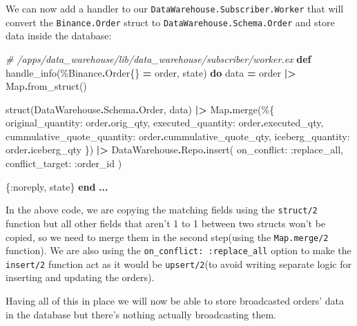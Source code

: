 \documentclass[
  oneside]{book}
\newenvironment{Shaded}{\begin{snugshade}}{\end{snugshade}}
\newcommand{\CommentTok}[1]{\textcolor[rgb]{0.56,0.35,0.01}{\textit{#1}}}
\newcommand{\ConstantTok}[1]{\textcolor[rgb]{0.00,0.00,0.00}{#1}}
\newcommand{\KeywordTok}[1]{\textcolor[rgb]{0.13,0.29,0.53}{\textbf{#1}}}
\newcommand{\NormalTok}[1]{#1}
\newcommand{\OperatorTok}[1]{\textcolor[rgb]{0.81,0.36,0.00}{\textbf{#1}}}
\newcommand{\VariableTok}[1]{\textcolor[rgb]{0.00,0.00,0.00}{#1}}
\begin{document}
We can now add a handler to our \texttt{DataWarehouse.Subscriber.Worker} that will convert the \texttt{Binance.Order} struct to \texttt{DataWarehouse.Schema.Order} and store data inside the database:

\begin{Shaded}
\begin{Highlighting}[]
\CommentTok{\# /apps/data\_warehouse/lib/data\_warehouse/subscriber/worker.ex}
  \KeywordTok{def}\NormalTok{ handle\_info(\%}\ConstantTok{Binance}\OperatorTok{.}\ConstantTok{Order}\NormalTok{\{\} }\OperatorTok{=}\NormalTok{ order, state) }\KeywordTok{do}
\NormalTok{    data }\OperatorTok{=}
\NormalTok{      order}
      \OperatorTok{|\textgreater{}} \ConstantTok{Map}\OperatorTok{.}\NormalTok{from\_struct()}

\NormalTok{    struct(}\ConstantTok{DataWarehouse}\OperatorTok{.}\ConstantTok{Schema}\OperatorTok{.}\ConstantTok{Order}\NormalTok{, data)}
    \OperatorTok{|\textgreater{}} \ConstantTok{Map}\OperatorTok{.}\NormalTok{merge(\%\{}
      \VariableTok{original\_quantity:}\NormalTok{ order}\OperatorTok{.}\NormalTok{orig\_qty,}
      \VariableTok{executed\_quantity:}\NormalTok{ order}\OperatorTok{.}\NormalTok{executed\_qty,}
      \VariableTok{cummulative\_quote\_quantity:}\NormalTok{ order}\OperatorTok{.}\NormalTok{cummulative\_quote\_qty,}
      \VariableTok{iceberg\_quantity:}\NormalTok{ order}\OperatorTok{.}\NormalTok{iceberg\_qty}
\NormalTok{    \})}
    \OperatorTok{|\textgreater{}} \ConstantTok{DataWarehouse}\OperatorTok{.}\ConstantTok{Repo}\OperatorTok{.}\NormalTok{insert(}
      \VariableTok{on\_conflict:} \VariableTok{:replace\_all}\NormalTok{,}
      \VariableTok{conflict\_target:} \VariableTok{:order\_id}
\NormalTok{    )}

\NormalTok{    \{}\VariableTok{:noreply}\NormalTok{, state\}}
  \KeywordTok{end}
  \OperatorTok{...}
\end{Highlighting}
\end{Shaded}

In the above code, we are copying the matching fields using the \texttt{struct/2} function but all other fields that aren't 1 to 1 between two structs won't be copied, so we need to merge them in the second step(using the \texttt{Map.merge/2} function). We are also using the \texttt{on\_conflict:\ :replace\_all} option to make the \texttt{insert/2} function act as it would be \texttt{upsert/2}(to avoid writing separate logic for inserting and updating the orders).

Having all of this in place we will now be able to store broadcasted orders' data in the database but there's nothing actually broadcasting them.
\end{document}
